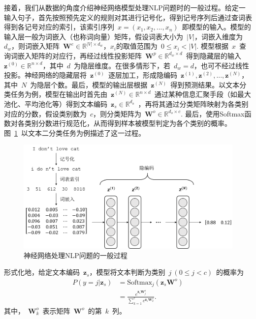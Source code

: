 接着，我们从数据的角度介绍神经网络模型处理NLP问题时的一般过程。给定一输入句子，首先按照预先定义的规则对其进行记号化，得到记号序列后通过查词表得到各记号对应的索引，该索引序列~$x = (x_1, x_2, ..., x_n)$~即模型的输入。模型的输入层一般为词嵌入（也称词向量）矩阵，假设词表大小为~$|V|$，词嵌入维度为~$d_w$，则词嵌入矩阵~$\mathbf{W}^e \in \mathbb{R}^{|V|\times d_w}$，$x_i$的取值范围为~$0 \le x_i < |V|$. 模型根据~$x$~查询词嵌入矩阵的对应行，再经过线性投影矩阵~$\mathbf{W}^p\in \mathbb{R}^{d_w \times d}$~得到隐藏层的输入~$\mathbf{z}^{(0)}\in \mathbb{R}^{n\times d}$，其中~$d$~为隐层维度。在很多情形下，若~$d_w = d$，也可不经过线性投影。神经网络的隐藏层将~$\mathbf{z}^{(0)}$~逐层加工，形成隐编码~$\mathbf{z}^{(1)}, \mathbf{z}^{(2)}, ..., \mathbf{z}^{(N)}$，其中~$N$~为隐层个数。最后，模型的输出层根据~$\mathbf{z}^{(N)}$~得到预测结果。以文本分类任务为例，模型在输出时首先由~$\mathbf{z}^{(N)}\in \mathbb{R}^{n\times d}$~通过某种信息汇聚手段（如最大池化、平均池化等）得到文本编码~$\mathbf{z}_s\in \mathbb{R}^{d_o}$~，再将其通过分类矩阵映射为各类别对应的分数，假设类别数为~$c$，则分类矩阵为~$\mathbf{W}^o\in \mathbb{R}^{d_o\times c}$. 最后，使用Softmax函数对各类别分数进行规范化，从而得到样本被模型判定为各个类别的概率。图~\ref{fig:nlp_ppl}~以文本二分类任务为例描述了这一过程。

\begin{figure}[htb]
	\centering
	\includegraphics[scale=0.55]{nlp_pipline.png}
	\caption{神经网络处理NLP问题的一般过程}
	\label{fig:nlp_ppl}
\end{figure}

形式化地，给定文本编码~$\mathbf{z}_s$，模型将文本判断为类别~$j~(0\le j < c)$~的概率为
\begin{align}
	P(y = j | \mathbf{z}_s) &= \mathrm{Softmax}_j(\mathbf{z}_s\mathbf{W}^o) \nonumber \\
	&= \frac{e^{\mathbf{z}_s\mathbf{W}^o_j}}{\sum_{k=1}^{c}e^{\mathbf{z}_s\mathbf{W}^o_k}}.
\label{eq:softmax}
\end{align}
其中，~$\mathbf{W}^o_k$~表示矩阵~$\mathbf{W}^o$~的第~$k$~列。

